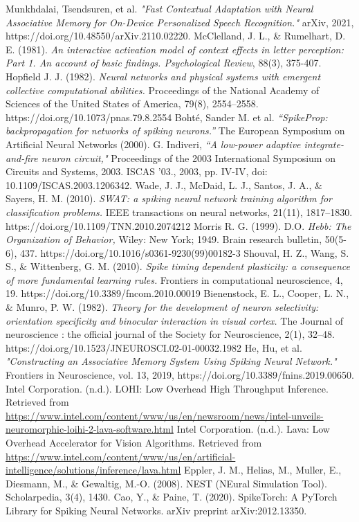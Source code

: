 \begin{thebibliography}{99}
	Munkhdalai, Tsendsuren, et al. \emph{"Fast Contextual Adaptation with Neural Associative Memory for On-Device Personalized Speech Recognition."} arXiv, 2021, https://doi.org/10.48550/arXiv.2110.02220.
	McClelland, J. L., \& Rumelhart, D. E. (1981). \emph{An interactive activation model of context effects in letter perception: Part 1. An account of basic findings. Psychological Review}, 88(3), 375-407.
	Hopfield J. J. (1982). \emph{Neural networks and physical systems with emergent collective computational abilities.} Proceedings of the National Academy of Sciences of the United States of America, 79(8), 2554–2558. https://doi.org/10.1073/pnas.79.8.2554
	Bohté, Sander M. et al. \emph{“SpikeProp: backpropagation for networks of spiking neurons.”} The European Symposium on Artificial Neural Networks (2000).
	G. Indiveri, \emph{“A low-power adaptive integrate-and-fire neuron circuit,"} Proceedings of the 2003 International Symposium on Circuits and Systems, 2003. ISCAS '03., 2003, pp. IV-IV, doi: 10.1109/ISCAS.2003.1206342.
	Wade, J. J., McDaid, L. J., Santos, J. A., \& Sayers, H. M. (2010). \emph{SWAT: a spiking neural network training algorithm for classification problems.} IEEE transactions on neural networks, 21(11), 1817–1830. https://doi.org/10.1109/TNN.2010.2074212
	Morris R. G. (1999). D.O. \emph{Hebb: The Organization of Behavior,} Wiley: New York; 1949. Brain research bulletin, 50(5-6), 437. https://doi.org/10.1016/s0361-9230(99)00182-3
	Shouval, H. Z., Wang, S. S., \& Wittenberg, G. M. (2010). \emph{Spike timing dependent plasticity: a consequence of more fundamental learning rules.} Frontiers in computational neuroscience, 4, 19. https://doi.org/10.3389/fncom.2010.00019
	Bienenstock, E. L., Cooper, L. N., \& Munro, P. W. (1982). \emph{Theory for the development of neuron selectivity: orientation specificity and binocular interaction in visual cortex.} The Journal of neuroscience : the official journal of the Society for Neuroscience, 2(1), 32–48. https://doi.org/10.1523/JNEUROSCI.02-01-00032.1982
	He, Hu, et al. \emph{"Constructing an Associative Memory System Using Spiking Neural Network."} Frontiers in Neuroscience, vol. 13, 2019, https://doi.org/10.3389/fnins.2019.00650.
	Intel Corporation. (n.d.). LOHI: Low Overhead High Throughput Inference. Retrieved from \url{https://www.intel.com/content/www/us/en/newsroom/news/intel-unveils-neuromorphic-loihi-2-lava-software.html}
	Intel Corporation. (n.d.). Lava: Low Overhead Accelerator for Vision Algorithms. Retrieved from \url{https://www.intel.com/content/www/us/en/artificial-intelligence/solutions/inference/lava.html}
	Eppler, J. M., Helias, M., Muller, E., Diesmann, M., \& Gewaltig, M.-O. (2008). NEST (NEural Simulation Tool). Scholarpedia, 3(4), 1430.
	Cao, Y., \& Paine, T. (2020). SpikeTorch: A PyTorch Library for Spiking Neural Networks. arXiv preprint arXiv:2012.13350.

\end{thebibliography}